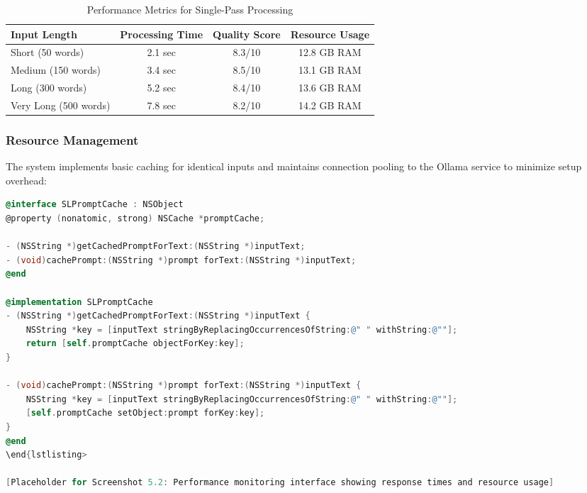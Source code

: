 \begin{table}[H]
\begin{table}[H]
\begin{table}[H]
\centering
\caption{Performance Metrics for Single-Pass Processing}
\label{tab:performance_metrics}
{\begin{tabular}{lccc}
\toprule
\textbf{Input Length} & \textbf{Processing Time} & \textbf{Quality Score} & \textbf{Resource Usage} \\
\midrule
Short (50 words) & 2.1 sec & 8.3/10 & 12.8 GB RAM \\
Medium (150 words) & 3.4 sec & 8.5/10 & 13.1 GB RAM \\
Long (300 words) & 5.2 sec & 8.4/10 & 13.6 GB RAM \\
Very Long (500 words) & 7.8 sec & 8.2/10 & 14.2 GB RAM \\
\bottomrule
\end{tabular}}
\end{table}

\subsubsection{Resource Management}

The system implements basic caching for identical inputs and maintains connection pooling to the Ollama service to minimize setup overhead:

\begin{lstlisting}[language=C,basicstyle=\footnotesize\ttfamily,frame=single,breaklines=true,columns=flexible,caption={Simple Caching Implementation},label={lst:simple_caching}]
@interface SLPromptCache : NSObject
@property (nonatomic, strong) NSCache *promptCache;

- (NSString *)getCachedPromptForText:(NSString *)inputText;
- (void)cachePrompt:(NSString *)prompt forText:(NSString *)inputText;
@end

@implementation SLPromptCache
- (NSString *)getCachedPromptForText:(NSString *)inputText {
    NSString *key = [inputText stringByReplacingOccurrencesOfString:@" " withString:@""];
    return [self.promptCache objectForKey:key];
}

- (void)cachePrompt:(NSString *)prompt forText:(NSString *)inputText {
    NSString *key = [inputText stringByReplacingOccurrencesOfString:@" " withString:@""];
    [self.promptCache setObject:prompt forKey:key];
}
@end
\end{lstlisting>

[Placeholder for Screenshot 5.2: Performance monitoring interface showing response times and resource usage]


\end{lstlisting}
\end{table}
\end{table}
